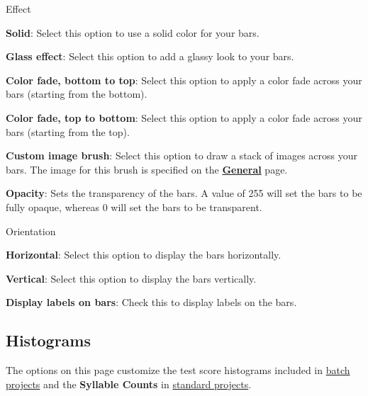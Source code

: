 \documentclass[
]{book}
\newenvironment{optionssection}
    {
    \begin{tcolorbox}[colframe=lightgray,colback=ultralightgray,sharp corners=all,parbox=false]
    }
    {
    \end{tcolorbox}
    }
\newenvironment{optionssectiontitle}
    {
    \begin{tcolorbox}[colframe=lightgray,colback=lightgray]
    \bfseries
    }
    {
    \end{tcolorbox}
    }
\theoremstyle{definition}
\theoremstyle{definition}
\theoremstyle{definition}
\theoremstyle{definition}
\theoremstyle{remark}
\begin{document}
\begin{optionssection}

\begin{optionssectiontitle}
Effect

\end{optionssectiontitle}

\textbf{Solid}: Select this option to use a solid color for your bars.

\textbf{Glass effect}: Select this option to add a glassy look to your bars.

\textbf{Color fade, bottom to top}: Select this option to apply a color fade across your bars (starting from the bottom).

\textbf{Color fade, top to bottom}: Select this option to apply a color fade across your bars (starting from the top).

\textbf{Custom image brush}: Select this option to draw a stack of images across your bars. The image for this brush is specified on the \protect\hyperlink{options-graphs}{\textbf{General}} page.

\end{optionssection}

\textbf{Opacity}: Sets the transparency of the bars. A value of 255 will set the bars to be fully opaque, whereas 0 will set the bars to be transparent.

\begin{optionssection}

\begin{optionssectiontitle}
Orientation

\end{optionssectiontitle}

\textbf{Horizontal}: Select this option to display the bars horizontally.

\textbf{Vertical}: Select this option to display the bars vertically.

\end{optionssection}

\textbf{Display labels on bars}: Check this to display labels on the bars.

\hypertarget{options-histograms}{%
\subsection*{Histograms}\label{options-histograms}}

The options on this page customize the test score histograms included in \protect\hyperlink{creating-batch-project}{batch projects} and the \textbf{Syllable Counts} in \protect\hyperlink{creating-standard-project}{standard projects}.
\end{document}
